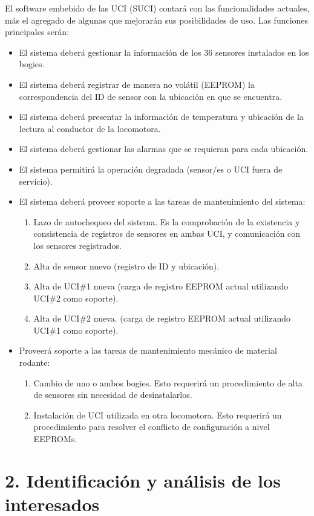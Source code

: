 \documentclass[
11pt, %
codirector, %
]{charter}
\begin{document}
El software embebido de las UCI (SUCI) contará con las funcionalidades actuales, más el agregado de algunas que mejorarán sus posibilidades de uso. Las funciones principales serán:
\begin{itemize}
\item El sistema deberá gestionar la información de los 36 sensores instalados en los bogies.
	\item El sistema deberá registrar de manera no volátil (EEPROM) la correspondencia del ID de sensor con la ubicación en que se encuentra.
	\item El sistema deberá presentar la información de temperatura y ubicación de la lectura al conductor de la locomotora.
	\item El sistema deberá gestionar las alarmas que se requieran para cada ubicación.
	\item El sistema permitirá la operación degradada (sensor/es o UCI fuera de servicio).
	\item El sistema deberá proveer soporte a las tareas de mantenimiento del sistema:
	\begin{enumerate}
	\item Lazo de autochequeo del sistema. Es la comprobación de la existencia y consistencia de registros de sensores en ambas UCI, y comunicación con los sensores registrados.
	\item Alta de sensor nuevo (registro de ID y ubicación). 
	\item Alta de UCI\#1 nueva (carga de registro EEPROM actual utilizando UCI\#2 como soporte).
	\item Alta de UCI\#2 nueva. (carga de registro EEPROM actual utilizando UCI\#1 como soporte).
	\end{enumerate}
	\item Proveerá soporte a las tareas de mantenimiento mecánico de material rodante: 
	\begin{enumerate}
	\item Cambio de uno o ambos bogies. Esto requerirá un procedimiento de alta de sensores sin necesidad de desinstalarlos.
	\item Instalación de UCI utilizada en otra locomotora. Esto requerirá un procedimiento para resolver el conflicto de configuración a nivel EEPROMs.   
	\end{enumerate}
\end{itemize}
 
\section{2. Identificación y análisis de los interesados}
\label{sec:interesados}
\end{document}

